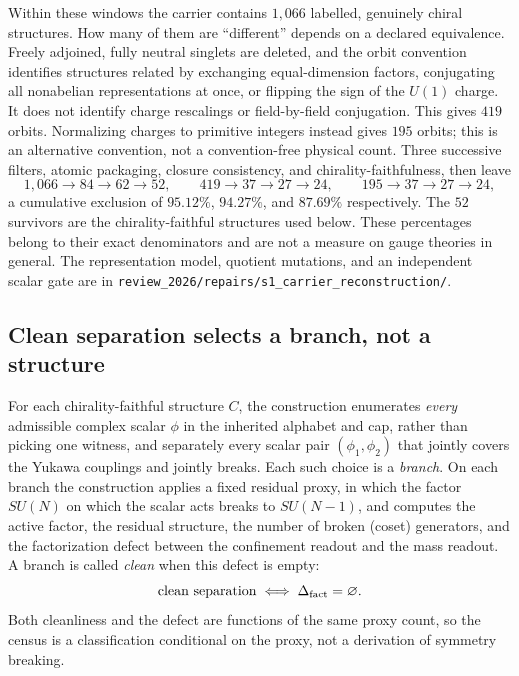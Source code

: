 Within these windows the carrier contains \(1{,}066\) labelled, genuinely chiral structures. How many of them are
``different'' depends on a declared equivalence. Freely adjoined, fully neutral singlets are deleted, and the orbit
convention identifies structures related by exchanging equal-dimension factors, conjugating all nonabelian
representations at once, or flipping the sign of the \(U(1)\) charge. It does not identify charge rescalings or
field-by-field conjugation. This gives \(419\) orbits. Normalizing charges to primitive integers instead gives \(195\)
orbits; this is an alternative convention, not a convention-free physical count. Three successive filters, atomic packaging, closure
consistency, and chirality-faithfulness, then leave
\[
1{,}066\to84\to62\to52,\qquad
419\to37\to27\to24,\qquad
195\to37\to27\to24,
\]
a cumulative exclusion of \(95.12\%\), \(94.27\%\), and \(87.69\%\) respectively. The \(52\) survivors are the
chirality-faithful structures used below.
These percentages belong to their exact denominators and are not a measure on gauge theories in general. The
representation model, quotient mutations, and an independent scalar gate are in
\nolinkurl{review_2026/repairs/s1_carrier_reconstruction/}.



\subsection{Clean separation selects a branch, not a structure}\label{conditional-selection-of-mathfraksu2oplusmathfraksu3oplusmathfraku1}

For each chirality-faithful structure \(C\), the construction enumerates \emph{every} admissible complex scalar
\(\phi\) in the inherited alphabet and cap, rather than picking one witness, and separately every scalar pair
\((\phi_1,\phi_2)\) that jointly covers the Yukawa couplings and jointly breaks. Each such choice is a \emph{branch}.
On each branch the construction applies a fixed residual proxy, in which the factor \(SU(N)\) on which the scalar acts
breaks to \(SU(N-1)\), and computes the active factor, the residual structure, the number of broken (coset)
generators, and the factorization defect between the confinement readout and the mass readout. A branch is called
\emph{clean} when this defect is empty:
\[
\text{clean separation}\iff\Delta_{\mathrm{fact}}=\varnothing .
\]
Both cleanliness and the defect are functions of the same proxy count, so the census is a classification conditional
on the proxy, not a derivation of symmetry breaking.

